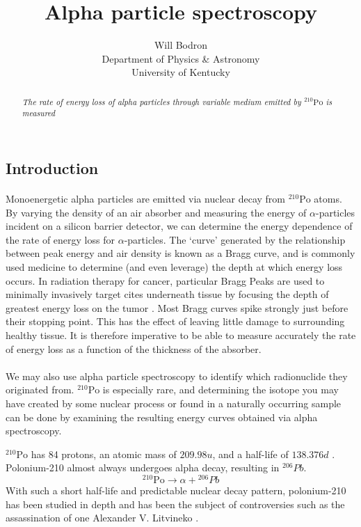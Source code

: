 \documentclass[12pt]{article}
\title{Alpha particle spectroscopy}
\author{Will Bodron \\ Department of Physics \& Astronomy \\ University of Kentucky}
\newcommand{\po}{{}^{210}\text{Po}}
\begin{document}
\maketitle

\begin{abstract}
    \textit{The rate of energy loss of alpha particles through variable medium emitted by $\po$ is measured }
\end{abstract}

\begin{multicols}{2}

    \section{Introduction}
    \paragraph{} Monoenergetic alpha particles are emitted via nuclear decay from $\po$ atoms. By varying the density of an air absorber and measuring the energy of $\alpha$-particles incident on a silicon barrier detector, we can determine the energy dependence of the rate of energy loss for $\alpha$-particles. \cite{kovash} The `curve' generated by the relationship between peak energy and air density is known as a Bragg curve, and is commonly used medicine to determine (and even leverage) the depth at which energy loss occurs. In radiation therapy for cancer, particular Bragg Peaks are used to minimally invasively target cites underneath tissue by focusing the depth of greatest energy loss on the tumor \cite{brookhaven}. Most Bragg curves spike strongly just before their stopping point. This has the effect of leaving little damage to surrounding healthy tissue. It is therefore imperative to be able to measure accurately the rate of energy loss as a function of the thickness of the absorber.
    \paragraph{} We may also use alpha particle spectroscopy to identify which radionuclide they originated from. $\po$ is especially rare, and determining the isotope you may have created by some nuclear process or found in a naturally occurring sample can be done by examining the resulting energy curves obtained via alpha spectroscopy.

    $\po$ has 84 protons, an atomic mass of $209.98 u$, and a half-life of $138.376 d$ \cite{table}. Polonium-210 almost always undergoes alpha decay, resulting in ${}^{206}Pb$.
    \begin{equation}
        \po \rightarrow \alpha + {}^{206}Pb
    \end{equation}
    With such a short half-life and predictable nuclear decay pattern, polonium-210 has been studied in depth and has been the subject of controversies such as the assassination of one Alexander V. Litvineko \cite{roessler}.



\end{multicols}
\end{document}
